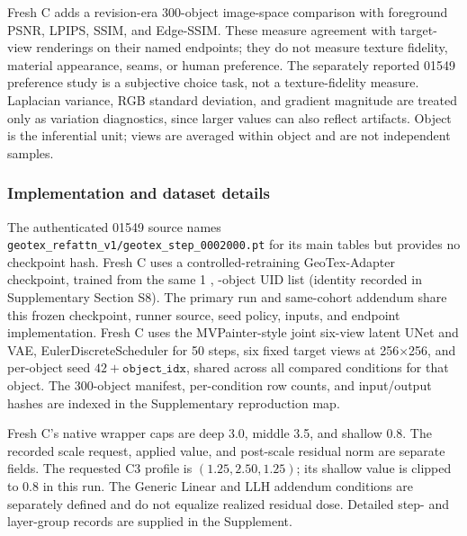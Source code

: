 \documentclass[times,twocolumn,final]{elsarticle}
\providecommand{\DIFadd}[1]{{\protect\color{blue} \sf #1}} %
\providecommand{\DIFaddbegin}{} %
\providecommand{\DIFaddend}{} %
\begin{document}
  \DIFaddbegin \DIFadd{Fresh C adds a revision-era 300-object image-space comparison with foreground PSNR, LPIPS, SSIM, and Edge-SSIM. These measure agreement with target-view renderings on their named endpoints; they do not measure texture fidelity, material appearance, seams, or human preference. The separately reported 01549 preference study is a subjective choice task, not a texture-fidelity measure. }\DIFaddend Laplacian variance, RGB standard deviation, and gradient magnitude   \DIFaddbegin \DIFadd{are treated only as variation diagnostics, since larger values can also reflect artifacts. Object is the inferential unit; views are averaged within object and are not independent samples}\DIFaddend .

 
 \subsubsection{Implementation and dataset details}
 
 \DIFaddbegin 

\DIFadd{The authenticated 01549 source names \texttt{geotex\_refattn\_v1/geotex\_step\_0002000.pt} for its main tables but provides no checkpoint hash. Fresh C uses a controlled-retraining GeoTex-Adapter checkpoint, trained from the same }\DIFaddend 1  , 
 \DIFaddbegin \DIFadd{118-object UID list (identity recorded in Supplementary Section S8). The primary run and same-cohort addendum share this frozen checkpoint, runner source, seed policy, inputs, and endpoint implementation. Fresh C uses the }\DIFaddend MVPainter-style   \DIFaddbegin \DIFadd{joint }\DIFaddend six-view   \DIFaddbegin \DIFadd{latent UNet and VAE, EulerDiscreteScheduler for }\DIFaddend 50   \DIFaddbegin \DIFadd{steps, six fixed target views at 256$\times$256, and per-object seed $42+\texttt{object\_idx}$, shared across all compared conditions for that object. The 300-object manifest, per-condition row counts, and input/output hashes are indexed in the Supplementary reproduction map.
}

\DIFadd{Fresh C's native wrapper caps are deep 3.0, middle 3.5, and shallow 0.8. The recorded scale request, applied value, and post-scale residual norm are separate fields. The requested C3 profile is $(1.25,2.50,1.25)$; its shallow value is clipped to 0.8 in this run. The Generic Linear and LLH addendum conditions are separately defined and do not equalize realized residual dose. Detailed step- and layer-group records are supplied in the Supplement}\DIFaddend .
\end{document}
